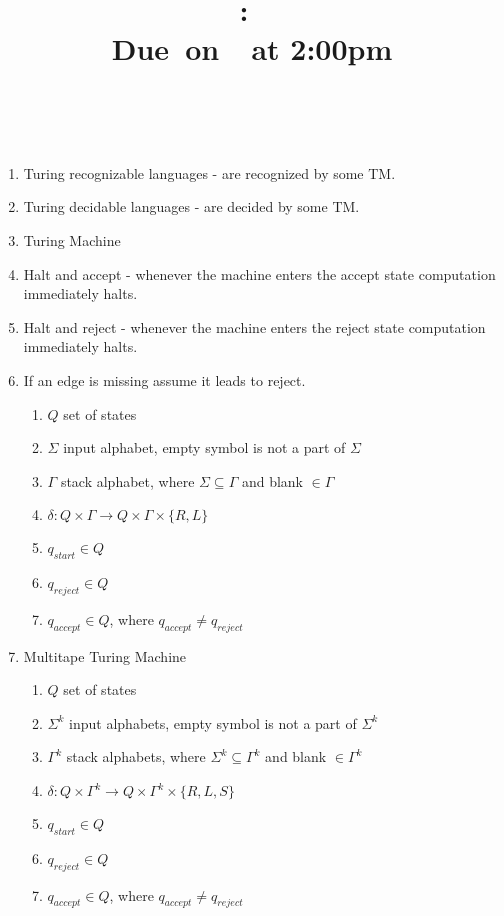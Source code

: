 \documentclass{article}
\title{
  \vspace{2in}
  \textmd{\textbf{\hmwkClass:\ \hmwkTitle}}\\
  \normalsize\vspace{0.1in}\small{Due\ on\ \hmwkDueDate\ at 2:00pm}\\
  \vspace{0.1in}\large{\textit{\hmwkClassInstructor\ \hmwkClassTime}}
  \vspace{3in}
}
\author{\textbf{\hmwkAuthorName}}
\date{}
\newcommand\curl[1]{\{#1\}}
\begin{document}
\maketitle

\pagebreak

\begin{enumerate}[1., leftmargin = 0.5cm]
\itemsep0em
    \item Turing recognizable languages - are recognized by some TM.
    \item Turing decidable languages - are decided by some TM.
    \item Turing Machine
    \item Halt and accept - whenever the machine enters the accept state computation immediately halts.
    \item Halt and reject - whenever the machine enters the reject state computation immediately halts.
    \item If an edge is missing assume it leads to reject.
    
        \begin{enumerate}[1., leftmargin = 0.5cm]
        \itemsep0em
        \item $Q$ set of states
        \item $\Sigma$ input alphabet, empty symbol is not a part of $\Sigma$
        \item $\Gamma$ stack alphabet, where $\Sigma \subseteq \Gamma$ and blank $\in \Gamma$
        \item $\delta : Q \times \Gamma \rightarrow Q \times \Gamma \times \curl{R,L}$
        \item $q_{start} \in Q$
        \item $q_{reject} \in Q$
        \item $q_{accept} \in Q$, where $q_{accept} \ne q_{reject}$
        \end{enumerate}
    \item Multitape Turing Machine
        \begin{enumerate}[1., leftmargin = 0.5cm]
        \itemsep0em
        \item $Q$ set of states
        \item $\Sigma^k$ input alphabets, empty symbol is not a part of $\Sigma^k$
        \item $\Gamma^k$ stack alphabets, where $\Sigma^k \subseteq \Gamma^k$ and blank $\in \Gamma^k$
        \item $\delta : Q \times \Gamma^k \rightarrow Q \times \Gamma^k \times \curl{R,L,S}$
        \item $q_{start} \in Q$
        \item $q_{reject} \in Q$
        \item $q_{accept} \in Q$, where $q_{accept} \ne q_{reject}$
        \end{enumerate}


\end{enumerate}
\end{document}
